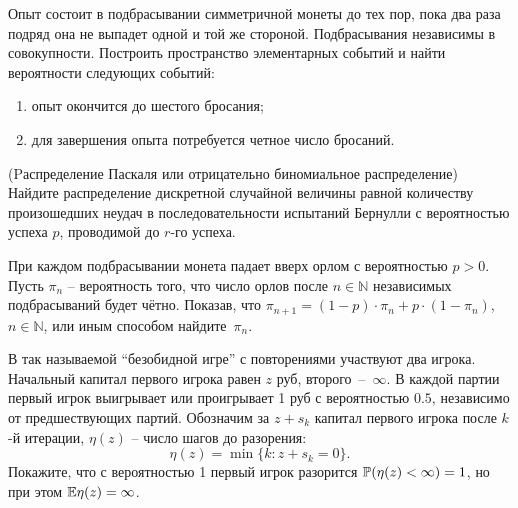 

\begin{problem}
Опыт состоит в подбрасывании симметричной монеты до тех пор, пока два раза подряд она не выпадет одной и той же стороной. Подбрасывания независимы в совокупности. 
Построить пространство элементарных событий и найти вероятности следующих событий: 
\begin{enumerate}
\item опыт окончится до шестого бросания; 
\item для завершения опыта потребуется четное число бросаний. 
\end{enumerate}
\end{problem}

\begin{problem}(Pаспределение Паскаля или отрицательно биномиальное распределение)
Найдите распределение дискретной случайной величины равной количеству произошедших неудач в последовательности испытаний Бернулли с вероятностью успеха $p$, проводимой до $r$-го успеха.

\end{problem}

\begin{problem}
При каждом подбрасывании монета падает вверх орлом с вероятностью $p>0$. Пусть $\pi _{n} $ -- вероятность того, что число орлов после $n\in {\mathbb N}$ независимых подбрасываний будет чётно. Показав, что $\pi _{n+1} =\left(1-p\right)\cdot \pi _{n} +p\cdot \left(1-\pi _{n} \right)$, $n\in {\mathbb N}$, или иным способом найдите~$\pi _{n} $. 
\end{problem}

\begin{comment}
\begin{problem}
Симметричную монету независимо бросили $n$ раз. Результат бросания записали в виде последовательности нулей и единиц. Покажите, что с вероятностью стремящейся к единице при $n\to \infty $ длина максимальной подпоследовательности из подряд идущих единиц лежит в промежутке
\[\left(\log \sqrt{n} ,\; \log n^{2} \right).\] 
\end{problem}
\end{comment}

\begin{problem}

В так называемой ``безобидной игре'' с повторениями участвуют два игрока. Начальный капитал первого игрока равен $z$ руб, второго~--~$\infty$. В каждой партии первый игрок выигрывает или проигрывает 1 руб с вероятностью $0.5$, независимо от предшествующих партий. Обозначим за $z + s_k$ капитал первого игрока после $k$-й итерации, $\eta(z)$ -- число шагов до разорения:
\[
\eta(z) = \min \{k: z + s_k = 0 \}.
\]     
Покажите, что с вероятностью 1 первый игрок разорится $\mathrm{{\mathbb P}}(\eta(z)<\infty) = 1$, но при этом $\mathrm{{\mathbb E}} \eta(z) = \infty$.  

\end{problem}

